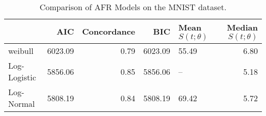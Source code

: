 \begin{table}
\centering
\caption{Comparison of AFR Models on the MNIST dataset.}
\label{tab:mnist}
\begin{tabular}{lrrrlr}
\toprule
 & AIC & Concordance & BIC & Mean $S(t;\theta)$ & Median $S(t;\theta)$ \\
\midrule
weibull & 6023.09 & 0.79 & 6023.09 & 55.49 & 6.80 \\
Log-Logistic & 5856.06 & 0.85 & 5856.06 & -- & 5.18 \\
Log-Normal & 5808.19 & 0.84 & 5808.19 & 69.42 & 5.72 \\
\bottomrule
\end{tabular}
\end{table}
